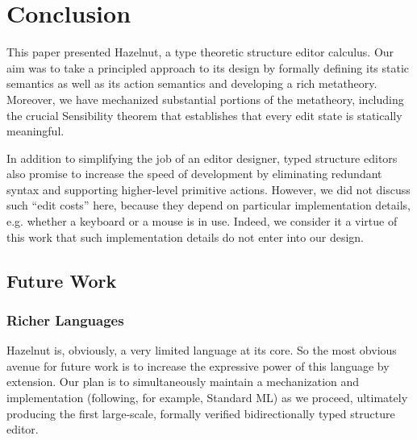 \documentclass[preprint,9pt]{sigplanconf}
\begin{document}
\section{Conclusion}
\label{sec:future}
This paper presented Hazelnut, a type theoretic structure editor calculus. Our aim was to take a principled approach to its design by formally defining its static semantics as well as its action semantics and developing a rich metatheory. Moreover, we have mechanized substantial portions of the metatheory, including the crucial Sensibility theorem that establishes that every edit state is statically meaningful.

In addition to simplifying the job of an editor designer, typed structure editors also promise to increase the speed of development by eliminating redundant syntax and supporting higher-level primitive actions. However, we did not discuss such ``edit costs'' here, because they depend on particular implementation details, e.g. whether a keyboard or a mouse is in use. Indeed, we consider it a virtue of this work that such implementation details do not enter into our design.


\subsection{Future Work}
\subsubsection{Richer Languages}
Hazelnut is, obviously, a very limited language at its core. So the most obvious avenue for future work is to increase the expressive power of this language by extension. Our plan is to simultaneously maintain a mechanization and implementation (following, for example, Standard ML) as we proceed, ultimately producing the first large-scale, formally verified bidirectionally typed structure editor.
\end{document}
